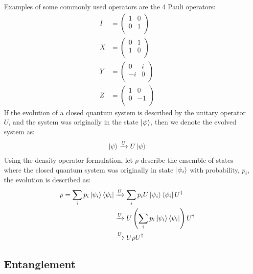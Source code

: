 Examples of some commonly used operators are the 4 Pauli operators:
\begin{align}
    I &= \begin{pmatrix}
        1 & 0 \\ 
        0 & 1 \\ 
    \end{pmatrix} \\ 
    X &= \begin{pmatrix}
        0 & 1 \\ 
        1 & 0 \\ 
    \end{pmatrix} \\ 
    Y &= \begin{pmatrix}
        0 & i \\ 
        -i & 0 \\ 
    \end{pmatrix} \\ 
    Z &= \begin{pmatrix}
        1 & 0 \\ 
        0 & -1 \\ 
    \end{pmatrix}
\end{align}
If the evolution of a closed quantum system is described by the unitary operator $U$, and the system was originally in the state $\ket{\psi}$, then we denote the evolved system as:
\begin{align}
    \ket{\psi} \xrightarrow{U} U \ket{\psi}
\end{align}
Using the density operator formulation, let $\rho$ describe the ensemble of states where the closed quantum system was originally in state $\ket{\psi_i}$ with probability, $p_i$, the evolution is described as:
\begin{align}
    \rho = \sum_i p_i \ket{\psi_i}\bra{\psi_i} &\xrightarrow{U} \sum_i p_i U\ket{\psi_i}\bra{\psi_i}U^{\dagger} \\
    &\xrightarrow{U} U \left(\sum_i p_i \ket{\psi_i}\bra{\psi_i} \right)U^{\dagger} \\
    &\xrightarrow{U} U \rho U^{\dagger}
\end{align}

\subsection{Entanglement}
\label{ssec:entanglement}

